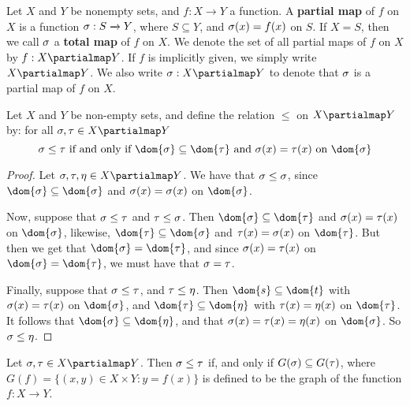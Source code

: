 \begin{definition}
  Let $X$ and $Y$ be nonempty sets, and $f:X \xrightarrow{} Y$ a
  function. A \textbf{partial map} of $f$ on $X$ is a function $\sigma:S
  \xrightarrow{} Y$, where $S \subseteq Y$, and $\sigma(x)=f(x)$ on $S$.
  If  $X=S$, then we call $\sigma$ a \textbf{total map} of $f$ on $X$. We
  denote the set of all partial maps of $f$ on $X$ by $f:X
  \partialmap Y$. If $f$ is implicitly given, we simply write $X
  \partialmap Y$. We also write $\s:X \partialmap Y$ to denote that
  $\sigma$ is a partial map of $f$ on $X$.
\end{definition}

\begin{proposition}\label{proposition_1.2.3}
  Let $X$ and  $Y$ be non-empty sets, and define the relation $\leq$
  on $X \partialmap Y$ by: for all  $\s,\t \in X \partialmap Y$
  \begin{equation*}
    \s \leq \t \text{ if and only if } \dom{\s} \subseteq \dom{\t}
    \text{ and } \s(x)=\t(x) \text{ on } \dom{\s}
  \end{equation*}
\end{proposition}
\begin{proof}
  Let $\s,\t,\n \in X \partialmap Y$. We have that $\sigma \leq \sigma$, since
  $\dom{\s} \subseteq \dom{\s}$ and $\sigma(x)=\sigma(x)$ on $\dom{\s}$.

  Now, suppose that $\sigma \leq \tau$ and $\tau \leq \sigma$. Then $\dom{\s}
  \subseteq \dom{\t}$ and $\sigma(x)=\tau(x)$ on $\dom{\s}$, likewise,
  $\dom{\t} \subseteq \dom{\s}$ and $\tau(x)=\sigma(x)$ on $\dom{\t}$. But
  then we get that $\dom{\s}=\dom{\t}$, and since $\sigma(x)=\tau(x)$ on
  $\dom{\s}=\dom{\t}$, we must have that $\sigma=\tau$.

  Finally, suppose that $\sigma \leq \tau$, and $\tau \leq \eta$. Then $\dom{s}
  \subseteq \dom{t}$ with $\sigma(x)=\tau(x)$ on $\dom{\s}$, and $\dom{\t}
  \subseteq \dom{\n}$ with $\tau(x)=\eta(x)$ on $\dom{\t}$. It follows
  that $\dom{\s} \subseteq \dom{\n}$, and that $\sigma(x)=\tau(x)=\eta(x)$ on
  $\dom{\s}$. So $\sigma \leq \eta$.
\end{proof}
\begin{corollary}
  Let $\s,\t \in X \partialmap Y$. Then $\sigma \leq \tau$ if, and only if
  $G(\sigma) \subseteq G(\tau)$, where $G(f)=\{(x,y) \in X \times Y : y=f(x)\}$
  is defined to be the graph of the function $f:X \xrightarrow{} Y$.
\end{corollary}

